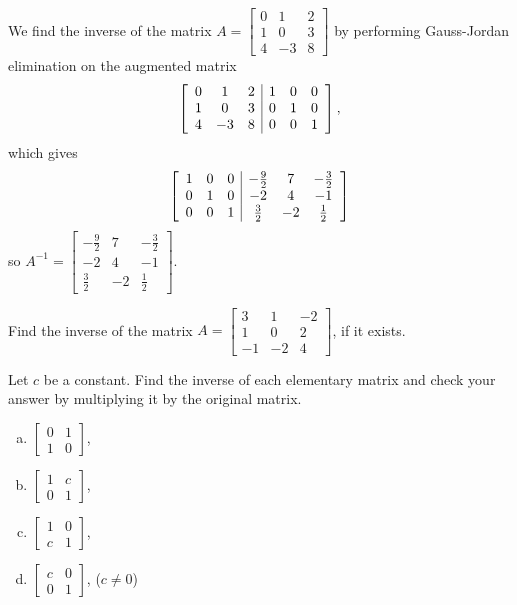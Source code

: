 \documentclass[12pt,letterpaper,reqno]{article}
\numberwithin{equation}{section}
\begin{document}
\begin{example}
We find the inverse of the matrix $A=\begin{bmatrix}
	0&1&2 \\ 1&0&3 \\ 4&-3&8
\end{bmatrix}$ by performing Gauss-Jordan elimination on the augmented matrix
\begin{align*}
\left[	\begin{array}{c c c | c c c}
		0 & 1 & 2 & 1 & 0 & 0 \\
		1 & 0 &3 & 0 & 1 & 0 \\
		4 & -3 & 8 & 0 & 0 & 1
	\end{array}\right],
\end{align*} which gives \begin{align*}
\left[	\begin{array}{c c c | c c c}
		1 & 0 & 0 & -\frac{9}{2} & 7 & -\frac{3}{2} \\
		0 & 1 & 0 & -2 & 4 & -1 \\
		0 & 0 & 1 & \frac{3}{2} & -2 & \frac{1}{2} 
	\end{array}\right]
\end{align*}
so $A^{-1}=\begin{bmatrix}
	-\frac{9}{2} & 7 & -\frac{3}{2} \\
	-2 & 4 & -1 \\
	\frac{3}{2} & -2 & \frac{1}{2}
\end{bmatrix}$.	
\end{example}

\begin{exercise}
Find the inverse of the matrix $A=\begin{bmatrix}
	3 & 1 & -2 \\ 1 & 0 & 2 \\ -1 & -2 & 4
\end{bmatrix}$, if it exists.	
\end{exercise}

\begin{exercise}
   Let $c$ be a  constant. Find the inverse of each elementary matrix and check your answer by multiplying it by the original matrix.
    \begin{enumerate}[(a)]
        \item $\begin{bmatrix} 0 & 1 \\ 1 & 0 \end{bmatrix}$,
        \item $\begin{bmatrix} 1 & c \\ 0 & 1 \end{bmatrix}$,
        \item $\begin{bmatrix} 1 & 0 \\ c & 1 \end{bmatrix}$,
        \item $\begin{bmatrix} c & 0 \\ 0 & 1 \end{bmatrix}$, ($c \neq 0$)
    \end{enumerate}
\end{exercise}
\end{document}
